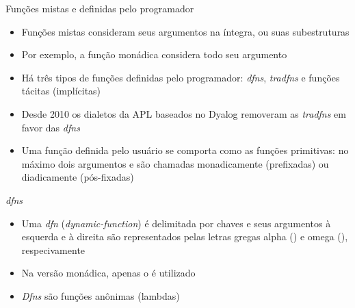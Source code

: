 \begin{frame}[fragile]{Funções mistas e definidas pelo programador}

    \begin{itemize}
        \item Funções mistas consideram seus argumentos na íntegra, ou suas subestruturas
        \pause

        \item Por exemplo, a função  monádica considera todo seu argumento
        \pause

        \item Há três tipos de funções definidas pelo programador: \textit{dfns}, \textit{tradfns}
            e funções tácitas (implícitas)
        \pause

        \item Desde 2010 os dialetos da APL baseados no Dyalog removeram as \textit{tradfns} em 
            favor das \textit{dfns}
        \pause

        \item Uma função definida pelo usuário se comporta como as funções primitivas: no máximo dois argumentos e são chamadas monadicamente (prefixadas) ou diadicamente (pós-fixadas)
    \end{itemize}

\end{frame}

\begin{frame}[fragile]{\it dfns}

    \begin{itemize}
        \item Uma \textit{dfn} (\textit{dynamic-function}) é delimitada por chaves e seus argumentos à esquerda e à direita são representados pelas letras gregas alpha () e omega (), respecivamente
        \pause

        \item Na versão monádica, apenas o  é utilizado
        \pause

        \item  \textit{Dfns} são funções anônimas (lambdas)
    \end{itemize}

\end{frame}

